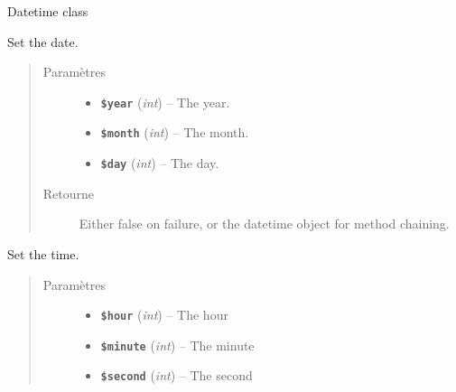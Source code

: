 \documentclass[a4paper,11pt,french]{rtdsphinxmanual}
\begin{document}
\begin{fulllineitems}
\label{extensions/sphinxcontrib-phpdomain:DateTime}
Datetime class

\begin{fulllineitems}
\label{extensions/sphinxcontrib-phpdomain:DateTime::setDate}
Set the date.
\begin{quote}\begin{description}
\item[{Paramètres}] \leavevmode\begin{itemize}
\item {} 
\textbf{\texttt{\$year}} (\emph{int}) -- The year.

\item {} 
\textbf{\texttt{\$month}} (\emph{int}) -- The month.

\item {} 
\textbf{\texttt{\$day}} (\emph{int}) -- The day.

\end{itemize}

\item[{Retourne}] \leavevmode
Either false on failure, or the datetime object for method chaining.

\end{description}\end{quote}

\end{fulllineitems}


\begin{fulllineitems}
\label{extensions/sphinxcontrib-phpdomain:DateTime::setTime}
Set the time.
\begin{quote}\begin{description}
\item[{Paramètres}] \leavevmode\begin{itemize}
\item {} 
\textbf{\texttt{\$hour}} (\emph{int}) -- The hour

\item {} 
\textbf{\texttt{\$minute}} (\emph{int}) -- The minute

\item {} 
\textbf{\texttt{\$second}} (\emph{int}) -- The second


\end{itemize}
\end{description}
\end{quote}
\end{fulllineitems}
\end{fulllineitems}
\end{document}
